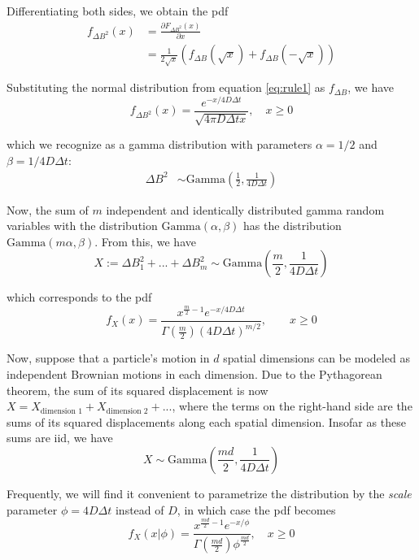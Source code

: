 \documentclass{article}
\begin{document}
Differentiating both sides, we obtain the pdf
\begin{align*}
    f_{\Delta B^{2}}(x) &= \frac{\partial F_{\Delta B^{2}}(x)}{\partial x} \\
    &= \frac{1}{2 \sqrt{x}} \left(
        f_{\Delta B} \left( \sqrt{x} \right) + f_{\Delta B} \left( - \sqrt{x} \right)
    \right)
\end{align*}

Substituting the normal distribution from equation \ref{eq:rule1} as $f_{\Delta B}$,
we have
\[
    f_{\Delta B^{2}}(x) = \frac{ e^{-x / 4 D \Delta t} }{ \sqrt{4 \pi D \Delta t x} }, \quad x \geq 0
\]

which we recognize as a gamma distribution with parameters $\alpha = 1/2$ and
$\beta = 1 / 4 D \Delta t$:
\begin{align*}
    \Delta B^{2} &\sim \text{Gamma} \left( \frac{1}{2}, \frac{1}{4 D \Delta t} \right)
\end{align*}

Now, the sum of $m$ independent and identically distributed gamma random variables
with the distribution $\text{Gamma} \left( \alpha, \beta \right)$ has the distribution
$\text{Gamma} \left( m \alpha, \beta \right)$. From this, we have
\begin{equation}
    X := \Delta B_{1}^{2} + ... + \Delta B_{m}^{2} \sim \text{Gamma} \left(
        \frac{m}{2}, \frac{1}{4 D \Delta t}
    \right)
\end{equation}

which corresponds to the pdf
\begin{equation}
    f_{X}(x) = \frac{x^{\frac{m}{2}-1} e^{-x / 4 D \Delta t}}{\Gamma \left( \frac{m}{2} \right) \left( 4 D \Delta t \right)^{m/2}}, \qquad x \geq 0
\end{equation}

Now, suppose that a particle's motion in $d$ spatial dimensions can be
modeled as independent Brownian motions in each dimension. Due to the Pythagorean
theorem, the sum of its squared displacement is now
$X = X_{\text{dimension 1}} + X_{\text{dimension 2}} + ...$, where
the terms on the right-hand side are the sums of its squared displacements along
each spatial dimension. Insofar as these sums are iid, we have
\begin{equation}\label{eq:brownian_likelihood}
    X \sim \text{Gamma} \left( \frac{md}{2}, \frac{1}{4 D \Delta t} \right)
\end{equation}

Frequently, we will find it convenient to parametrize the distribution by
the \emph{scale} parameter $\phi = 4 D \Delta t$ instead of $D$,
in which case the pdf becomes
\begin{equation}\label{eq:brownian_likelihood_2}
    f_{X}(x | \phi) = \frac{x^{\frac{md}{2} - 1} e^{-x / \phi}}{\Gamma \left( \frac{md}{2} \right) \phi^{\frac{md}{2}}}, \quad x \geq 0
\end{equation}
\end{document}
